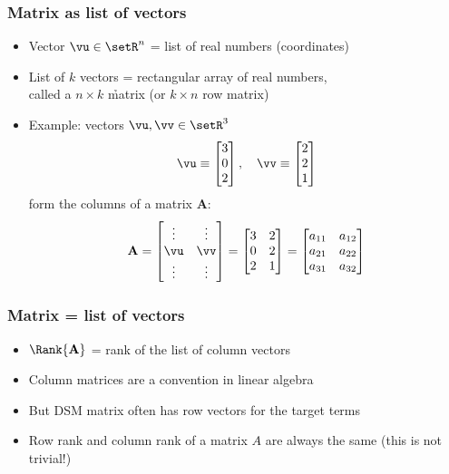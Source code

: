 \begin{frame}
  \frametitle{Matrix as list of vectors}

  \begin{itemize}
  \item Vector $\vu \in \setR^n$ = list of real numbers (coordinates)%
    \pause
  \item List of $k$ vectors = rectangular array of real numbers,\\
    called a $n\times k$ \h{matrix} (or $k\times n$ row matrix)%
    \pause
  \item Example: vectors $\vu, \vv\in \setR^3$
    \[
    \vu \equiv
    \begin{bmatrix}
      3\\ 0\\ 2
    \end{bmatrix},\quad
    \vv \equiv
    \begin{bmatrix}
      2\\ 2\\ 1
    \end{bmatrix}
    \]
    form the columns of a matrix $\mathbf{A}$:
    \[
    \mathbf{A} = 
    \begin{bmatrix}
       \vdots & \vdots \\
       \vu & \vv \\
       \vdots & \vdots
    \end{bmatrix} 
    =
    \begin{bmatrix}
      3 & 2 \\
      0 & 2 \\
      2 & 1
    \end{bmatrix}
    =
    \begin{bmatrix}
      a_{11} & a_{12} \\
      a_{21} & a_{22} \\
      a_{31} & a_{32}
    \end{bmatrix}
    \]
  \end{itemize}
\end{frame}

\begin{frame}
  \frametitle{Matrix = list of vectors}

  \begin{itemize}
  \item $\Rank{\mathbf{A}}$ = rank of the list of column vectors
  \item Column matrices are a convention in linear algebra
  \item But DSM matrix often has row vectors for the target terms
    \pause\gap
  \item Row rank and column rank of a matrix $A$ are always the same (this is
    not trivial!)
  \end{itemize}
\end{frame}

